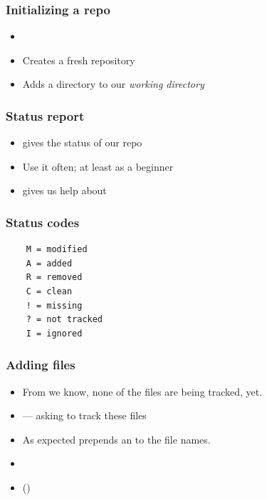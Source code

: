 \documentclass[14pt,compress]{beamer}
\begin{document}
\begin{frame}
  \frametitle{Initializing a repo}
  \begin{itemize}
  \item {}
  \item Creates a fresh repository
  \item Adds a  directory to our \emph{working directory}
  \end{itemize}
\end{frame}

\begin{frame}
  \frametitle{Status report}
  \begin{itemize}
  \item {} gives the status of our repo
  \item Use it often; at least as a beginner
  \item {} gives us help about 
  \end{itemize}
\end{frame}

\begin{frame}[fragile]
  \frametitle{Status codes}
  \begin{lstlisting}
    M = modified                                               
    A = added                                                  
    R = removed                                                
    C = clean                                                  
    ! = missing 
    ? = not tracked                                            
    I = ignored                                                
  \end{lstlisting}
\end{frame}

\begin{frame}
  \frametitle{Adding files}
  \begin{itemize}
  \item From  we know, none of the files are being
    tracked, yet. 
  \item {} --- asking  to track these files
  \item As expected  prepends an  to the file
  names.
  \item {} 
  \item {} ()
  \end{itemize}
\end{frame}
\end{document}
